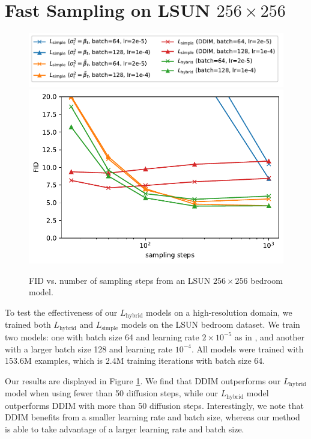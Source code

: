 \documentclass{article}
\begin{document}
\section{Fast Sampling on LSUN $256 \times 256$}
\begin{figure}[ht]
    \centering
    \includegraphics[width=\columnwidth]{fid_vs_steps_lsun_legend-eps.pdf}
    \includegraphics[width=\columnwidth]{fid_vs_steps_lsun-eps.pdf}
    \vskip -0.1in
    \caption{\label{fig:fidvssteps_lsun} FID vs. number of sampling steps from an LSUN $256 \times 256$ bedroom model.}
\end{figure}
To test the effectiveness of our $L_{\text{hybrid}}$ models on a high-resolution domain, we trained both $L_{\text{hybrid}}$ and $L_{\text{simple}}$ models on the LSUN bedroom \citep{lsun} dataset. We train two models: one with batch size 64 and learning rate $2 \times 10^{-5}$ as in \citet{ddpm}, and another with a larger batch size 128 and learning rate $10^{-4}$. All models were trained with 153.6M examples, which is 2.4M training iterations with batch size 64.

Our results are displayed in Figure \ref{fig:fidvssteps_lsun}. We find that DDIM outperforms our $L_{\text{hybrid}}$ model when using fewer than 50 diffusion steps, while our $L_{\text{hybrid}}$ model outperforms DDIM with more than 50 diffusion steps. Interestingly, we note that DDIM benefits from a smaller learning rate and batch size, whereas our method is able to take advantage of a larger learning rate and batch size.
\end{document}
